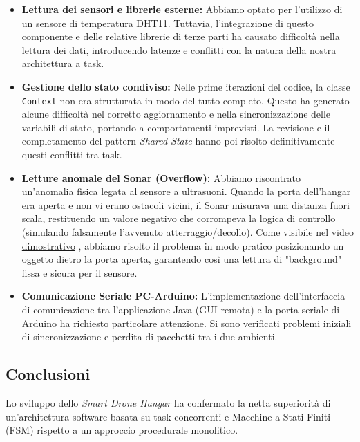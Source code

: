 \documentclass[12pt, a4paper]{article}
\begin{document}
\begin{itemize}
    \item \textbf{Lettura dei sensori e librerie esterne:} Abbiamo optato per l'utilizzo di un sensore di temperatura DHT11. Tuttavia, l'integrazione di questo componente e delle relative librerie di terze parti ha causato difficoltà nella lettura dei dati, introducendo latenze e conflitti con la natura della nostra architettura a task.
    \item \textbf{Gestione dello stato condiviso:} Nelle prime iterazioni del codice, la classe \texttt{Context} non era strutturata in modo del tutto completo. Questo ha generato alcune difficoltà nel corretto aggiornamento e nella sincronizzazione delle variabili di stato, portando a comportamenti imprevisti. La revisione e il completamento del pattern \textit{Shared State} hanno poi risolto definitivamente questi conflitti tra task.
    \item \textbf{Letture anomale del Sonar (Overflow):} Abbiamo riscontrato un'anomalia fisica legata al sensore a ultrasuoni. Quando la porta dell'hangar era aperta e non vi erano ostacoli vicini, il Sonar misurava una distanza fuori scala, restituendo un valore negativo che corrompeva la logica di controllo (simulando falsamente l'avvenuto atterraggio/decollo). Come visibile nel \href{https://liveunibo-my.sharepoint.com/:v:/g/personal/giuseppe_cattolico_studio_unibo_it/IQDR4nUTw_m4R4hXxXA34APrAXIrTUJt0A19q0IK9tlJYMQ?nav=eyJyZWZlcnJhbEluZm8iOnsicmVmZXJyYWxBcHAiOiJPbmVEcml2ZUZvckJ1c2luZXNzIiwicmVmZXJyYWxBcHBQbGF0Zm9ybSI6IldlYiIsInJlZmVycmFsTW9kZSI6InZpZXciLCJyZWZlcnJhbFZpZXciOiJNeUZpbGVzTGlua0NvcHkifX0&e=LSqfWy}{video dimostrativo}
, abbiamo risolto il problema in modo pratico posizionando un oggetto dietro la porta aperta, garantendo così una lettura di "background" fissa e sicura per il sensore.
    \item \textbf{Comunicazione Seriale PC-Arduino:} L'implementazione dell'interfaccia di comunicazione tra l'applicazione Java (GUI remota) e la porta seriale di Arduino ha richiesto particolare attenzione. Si sono verificati problemi iniziali di sincronizzazione e perdita di pacchetti tra i due ambienti.
\end{itemize}

\subsection{Conclusioni}
Lo sviluppo dello \textit{Smart Drone Hangar} ha confermato la netta superiorità di un'architettura software basata su task concorrenti e Macchine a Stati Finiti (FSM) rispetto a un approccio procedurale monolitico. 
\end{document}
